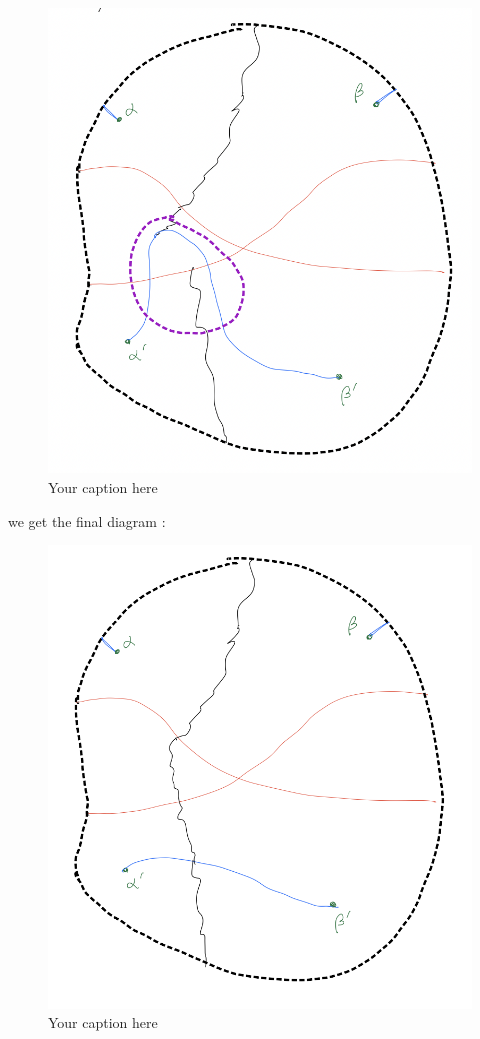 \begin{figure}[H] %
    \centering
    \includegraphics[width=\linewidth]{diagrams/definition10/10.png} %
    \caption{Your caption here}
    \label{fig:your-label}
\end{figure}

we get the final diagram :

\begin{figure}[H] %
    \centering
    \includegraphics[width=\linewidth]{diagrams/definition10/11.png} %
    \caption{Your caption here}
    \label{fig:your-label}
\end{figure}